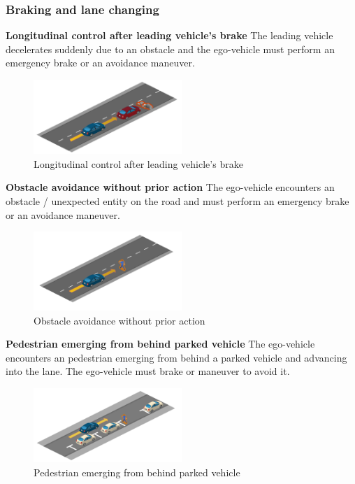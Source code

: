 \documentclass{article}
\begin{document}
\subsubsection{Braking and lane changing}
\textbf{Longitudinal control after leading vehicle’s brake} 
The leading vehicle decelerates suddenly due to an obstacle and the ego-vehicle must perform an emergency brake or an avoidance maneuver.
\begin{figure}[h]
    \centering
    \includegraphics[width=0.5\textwidth]{img/TR02.png}
    \caption{Longitudinal control after leading vehicle’s brake} \label{Scenario_longgitudinalControl}
\end{figure}

\textbf{Obstacle avoidance without prior action} 
The ego-vehicle encounters an obstacle / unexpected entity on the road and must perform an emergency brake or an avoidance maneuver.
\begin{figure}[h]
    \centering
    \includegraphics[width=0.5\textwidth]{img/TR03.png}
    \caption{Obstacle avoidance without prior action} \label{Scenario_obsAvoidanceWithout}
\end{figure}

\textbf{Pedestrian emerging from behind parked vehicle} 
The ego-vehicle encounters an pedestrian emerging from behind a parked vehicle and advancing into the lane. The ego-vehicle must brake or maneuver to avoid it.
\begin{figure}[h]
    \centering
    \includegraphics[width=0.5\textwidth]{img/TR17.png}
    \caption{Pedestrian emerging from behind parked vehicle} \label{Scenario_pedestrianEmerging}
\end{figure}
\end{document}
